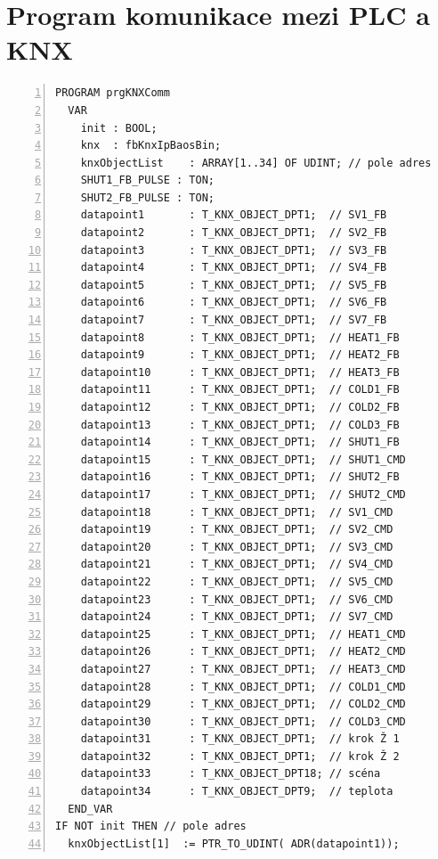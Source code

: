 \chapter{Program komunikace mezi PLC a KNX}
\label{apend:KNXComm}
\begin{lstlisting}[language=ST, breaklines=true, numbers=left, numberstyle=\small, numbersep=10pt, frame=single, basicstyle=\ttfamily\small, caption={Program komunikace mezi PLC a KNX}, label={lst:prgKNXComm}]
  PROGRAM prgKNXComm
  VAR
    init : BOOL;
    knx  : fbKnxIpBaosBin;
    knxObjectList    : ARRAY[1..34] OF UDINT; // pole adres
    SHUT1_FB_PULSE : TON;
    SHUT2_FB_PULSE : TON;
    datapoint1       : T_KNX_OBJECT_DPT1;  // SV1_FB
    datapoint2       : T_KNX_OBJECT_DPT1;  // SV2_FB
    datapoint3       : T_KNX_OBJECT_DPT1;  // SV3_FB
    datapoint4       : T_KNX_OBJECT_DPT1;  // SV4_FB
    datapoint5       : T_KNX_OBJECT_DPT1;  // SV5_FB
    datapoint6       : T_KNX_OBJECT_DPT1;  // SV6_FB
    datapoint7       : T_KNX_OBJECT_DPT1;  // SV7_FB
    datapoint8       : T_KNX_OBJECT_DPT1;  // HEAT1_FB
    datapoint9       : T_KNX_OBJECT_DPT1;  // HEAT2_FB
    datapoint10      : T_KNX_OBJECT_DPT1;  // HEAT3_FB
    datapoint11      : T_KNX_OBJECT_DPT1;  // COLD1_FB
    datapoint12      : T_KNX_OBJECT_DPT1;  // COLD2_FB
    datapoint13      : T_KNX_OBJECT_DPT1;  // COLD3_FB
    datapoint14      : T_KNX_OBJECT_DPT1;  // SHUT1_FB
    datapoint15      : T_KNX_OBJECT_DPT1;  // SHUT1_CMD
    datapoint16      : T_KNX_OBJECT_DPT1;  // SHUT2_FB
    datapoint17      : T_KNX_OBJECT_DPT1;  // SHUT2_CMD
    datapoint18      : T_KNX_OBJECT_DPT1;  // SV1_CMD
    datapoint19      : T_KNX_OBJECT_DPT1;  // SV2_CMD
    datapoint20      : T_KNX_OBJECT_DPT1;  // SV3_CMD
    datapoint21      : T_KNX_OBJECT_DPT1;  // SV4_CMD
    datapoint22      : T_KNX_OBJECT_DPT1;  // SV5_CMD
    datapoint23      : T_KNX_OBJECT_DPT1;  // SV6_CMD
    datapoint24      : T_KNX_OBJECT_DPT1;  // SV7_CMD
    datapoint25      : T_KNX_OBJECT_DPT1;  // HEAT1_CMD
    datapoint26      : T_KNX_OBJECT_DPT1;  // HEAT2_CMD
    datapoint27      : T_KNX_OBJECT_DPT1;  // HEAT3_CMD
    datapoint28      : T_KNX_OBJECT_DPT1;  // COLD1_CMD
    datapoint29      : T_KNX_OBJECT_DPT1;  // COLD2_CMD
    datapoint30      : T_KNX_OBJECT_DPT1;  // COLD3_CMD
    datapoint31      : T_KNX_OBJECT_DPT1;  // krok Ž 1
    datapoint32      : T_KNX_OBJECT_DPT1;  // krok Ž 2
    datapoint33      : T_KNX_OBJECT_DPT18; // scéna
    datapoint34      : T_KNX_OBJECT_DPT9;  // teplota
  END_VAR
IF NOT init THEN // pole adres
  knxObjectList[1]  := PTR_TO_UDINT( ADR(datapoint1));   

\end{lstlisting}
